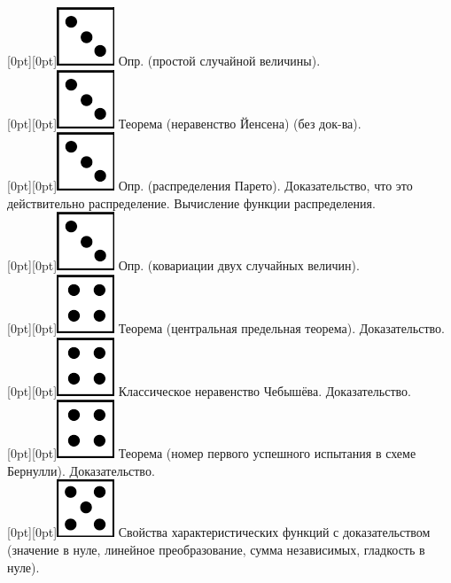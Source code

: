 \documentclass[10pt]{article}
\begin{document}
\raisebox{-1pt}[0pt][0pt]{\includegraphics[width=0.02\linewidth]{3.png}} Опр. (простой случайной величины). \\

\raisebox{-1pt}[0pt][0pt]{\includegraphics[width=0.02\linewidth]{3.png}} Теорема (неравенство Йенсена) (без док-ва). \\

\raisebox{-1pt}[0pt][0pt]{\includegraphics[width=0.02\linewidth]{3.png}} Опр. (распределения Парето). Доказательство, что это действительно распределение. Вычисление функции распределения. \\

\raisebox{-1pt}[0pt][0pt]{\includegraphics[width=0.02\linewidth]{3.png}} Опр. (ковариации двух случайных величин). \\

\raisebox{-1pt}[0pt][0pt]{\includegraphics[width=0.02\linewidth]{4.png}} Теорема (центральная предельная теорема). Доказательство. \\        

\raisebox{-1pt}[0pt][0pt]{\includegraphics[width=0.02\linewidth]{4.png}} Классическое неравенство Чебышёва. Доказательство. \\

\raisebox{-1pt}[0pt][0pt]{\includegraphics[width=0.02\linewidth]{4.png}} Теорема (номер первого успешного испытания в схеме Бернулли). Доказательство. \\

\raisebox{-1pt}[0pt][0pt]{\includegraphics[width=0.02\linewidth]{5.png}} Свойства характеристических функций с доказательством (значение в нуле, линейное преобразование, сумма независимых, гладкость в нуле). \\
\end{document}
